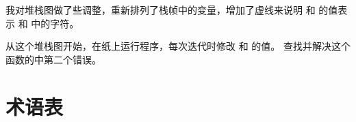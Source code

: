 
我对堆栈图做了些调整，重新排列了栈帧中的变量，增加了虚线来说明  和  的值表示  和  中的字符。



从这个堆栈图开始，在纸上运行程序，每次迭代时修改  和  的值。 查找并解决这个函数的中第二个错误。
\label{isreverse}


\section{术语表}


